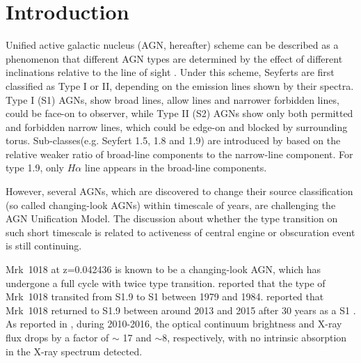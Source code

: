 \documentclass[twocolumn]{aastex63}
\begin{document}
\section{Introduction}\label{sec:intro} 
Unified active galactic nucleus (AGN, hereafter) scheme can be described as a phenomenon that different AGN types are determined by the effect of different inclinations relative to the line of sight \citep[see][]{1993ARA&A..31..473A}. Under this scheme, Seyferts are first classified as Type I or II, depending on the emission lines shown by their spectra. Type I (S1) AGNs, show broad lines, allow lines and narrower forbidden lines, could be face-on to observer, while Type II (S2) AGNs show only both permitted and forbidden narrow lines, which could be edge-on and blocked by surrounding torus. Sub-classes(e.g. Seyfert 1.5, 1.8 and 1.9) are introduced by \citet{1976MNRAS.176P..61O,1981ApJ...249..462O} based on the relative weaker ratio of broad-line components to the narrow-line component. For type 1.9, only $H\alpha$ line appears in the broad-line components. 

However, several AGNs, which are discovered to change their source classification (so called changing-look AGNs) within timescale of years, are challenging the AGN Unification Model. The discussion about whether the type transition on such short timescale is related to activeness of central engine or obscuration event is still continuing. 

Mrk~1018 at z=0.042436 is known to be a changing-look AGN, which has undergone a full cycle with twice type transition. \citet{1986ApJ...311..135C} reported that the type of Mrk~1018 transited from S1.9 to S1 between 1979 and 1984. \citet{2016A&A...593L...8M} reported that Mrk~1018 returned to S1.9 between around 2013 and 2015 after 30 years as a S1 \citep[see also][]{2017A&A...607L...9K}. %
As reported in \citet{2016A&A...593L...9H}, during 2010-2016, the optical continuum brightness and X-ray flux drops by a factor of $\sim$ 17 and $\sim 8$, respectively, with no intrinsic absorption in the X-ray spectrum detected. 
\end{document}

